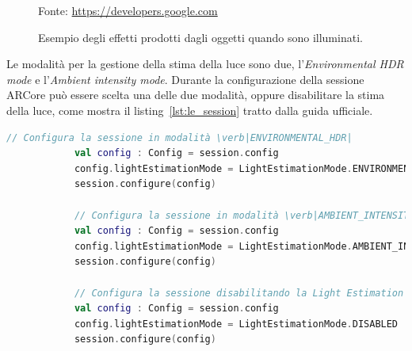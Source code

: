 \documentclass[crop=false, class=book]{standalone}
\begin{document}
	\begin{figure}
		\centering
			{Fonte: \url{https://developers.google.com}}
		\caption{Esempio degli effetti prodotti dagli oggetti quando sono illuminati.}
		\label{fig:light_effects}
	\end{figure}
    \noindent
	Le modalità per la gestione della stima della luce sono due, l'\textit{Environmental HDR mode} e l'\textit{Ambient intensity mode}. Durante la configurazione della sessione ARCore può essere scelta una delle due modalità, oppure disabilitare la stima della luce, come mostra il listing~\vref{lst:le_session} tratto dalla guida ufficiale.
	\\
	
	\begin{center}
		\begin{minipage}{0.95\textwidth}
			\begin{lstlisting}[caption={Configurazione della modalità di stima della luce.}, label={lst:le_session}, language=Kotlin]
			// Configura la sessione in modalità \verb|ENVIRONMENTAL_HDR|
			val config : Config = session.config
			config.lightEstimationMode = LightEstimationMode.ENVIRONMENTAL_HDR
			session.configure(config)
			
			// Configura la sessione in modalità \verb|AMBIENT_INTENSITY|
			val config : Config = session.config
			config.lightEstimationMode = LightEstimationMode.AMBIENT_INTENSITY
			session.configure(config)
				
			// Configura la sessione disabilitando la Light Estimation API
			val config : Config = session.config
			config.lightEstimationMode = LightEstimationMode.DISABLED
			session.configure(config)
			\end{lstlisting}
		\end{minipage}
	\end{center}
\end{document}
